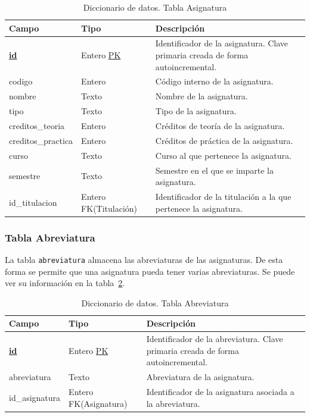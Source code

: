 \begin{table}
  \centering 
  \begin{tabular}{l p{} p{}}
    \toprule
    \textbf{Campo} & \textbf{Tipo} & \textbf{Descripción}\\
    \midrule
    \textbf{\underline{id}} & Entero \underline{PK} & Identificador de la asignatura. Clave primaria creada de forma autoincremental. \\ \addlinespace
    codigo & Entero & Código interno de la asignatura. \\ \addlinespace
    nombre & Texto & Nombre de la asignatura. \\ \addlinespace
    tipo & Texto & Tipo de la asignatura. \\ \addlinespace
    creditos\_teoria & Entero & Créditos de teoría de la asignatura. \\ \addlinespace
    creditos\_practica & Entero & Créditos de práctica de la asignatura. \\ \addlinespace
    curso & Texto & Curso al que pertenece la asignatura. \\ \addlinespace
    semestre & Texto & Semestre en el que se imparte la asignatura. \\ \addlinespace
    id\_titulacion & Entero FK(Titulación) & Identificador de la titulación a la que pertenece la asignatura. \\
    \bottomrule
  \end{tabular}
  \caption{Diccionario de datos. Tabla Asignatura}
  \label{tab:diccionario_asignatura}
\end{table}

\subsubsection{Tabla Abreviatura}
La tabla \texttt{abreviatura} almacena las abreviaturas de las asignaturas. 
De esta forma se permite que una asignatura pueda tener varias abreviaturas.
Se puede ver su información en la tabla~\ref{tab:diccionario_abreviatura}.

\begin{table}
  \centering 
  \begin{tabular}{l p{} p{}}
    \toprule
    \textbf{Campo} & \textbf{Tipo} & \textbf{Descripción}\\
    \midrule
    \textbf{\underline{id}} & Entero \underline{PK} & Identificador de la abreviatura. Clave primaria creada de forma autoincremental. \\ \addlinespace
    abreviatura & Texto & Abreviatura de la asignatura. \\ \addlinespace
    id\_asignatura & Entero FK(Asignatura) & Identificador de la asignatura asociada a la abreviatura. \\
    \bottomrule
  \end{tabular}
  \caption{Diccionario de datos. Tabla Abreviatura}
  \label{tab:diccionario_abreviatura}
\end{table}



